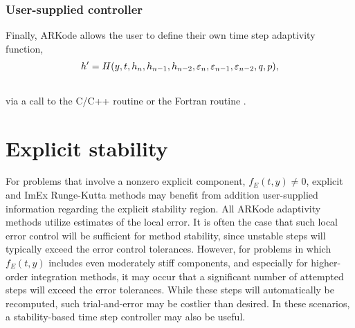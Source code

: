 \documentclass[letterpaper,10pt,english]{sphinxmanual}
\begin{document}
\subsubsection{User-supplied controller}
\label{Mathematics:mathematics-adaptivity-errorcontrol-user}\label{Mathematics:user-supplied-controller}
Finally, ARKode allows the user to define their own time step
adaptivity function,
\begin{gather}
\begin{split}h' = H(y, t, h_n, h_{n-1}, h_{n-2}, \varepsilon_n, \varepsilon_{n-1}, \varepsilon_{n-2}, q, p),\end{split}\notag\\\begin{split}\end{split}\notag
\end{gather}
via a call to the C/C++ routine {\hyperref[c_interface/User_callable:ARKodeSetAdaptivityFn]{}} or
the Fortran routine {\hyperref[f_interface/Usage:f/_/FARKADAPTSET]{}}.


\section{Explicit stability}
\label{Mathematics:mathematics-stability}\label{Mathematics:explicit-stability}
For problems that involve a nonzero explicit component,
$f_E(t,y) \ne 0$, explicit and ImEx Runge-Kutta methods may
benefit from addition user-supplied information regarding the explicit
stability region.  All ARKode adaptivity methods utilize estimates of
the local error.  It is often the case that such local error control
will be sufficient for method stability, since unstable steps will
typically exceed the error control tolerances.  However, for problems
in which $f_E(t,y)$ includes even moderately stiff components,
and especially for higher-order integration methods, it may occur that
a significant number of attempted steps will exceed the error
tolerances.  While these steps will automatically be recomputed, such
trial-and-error may be costlier than desired.  In these scenarios, a
stability-based time step controller may also be useful.
\end{document}
